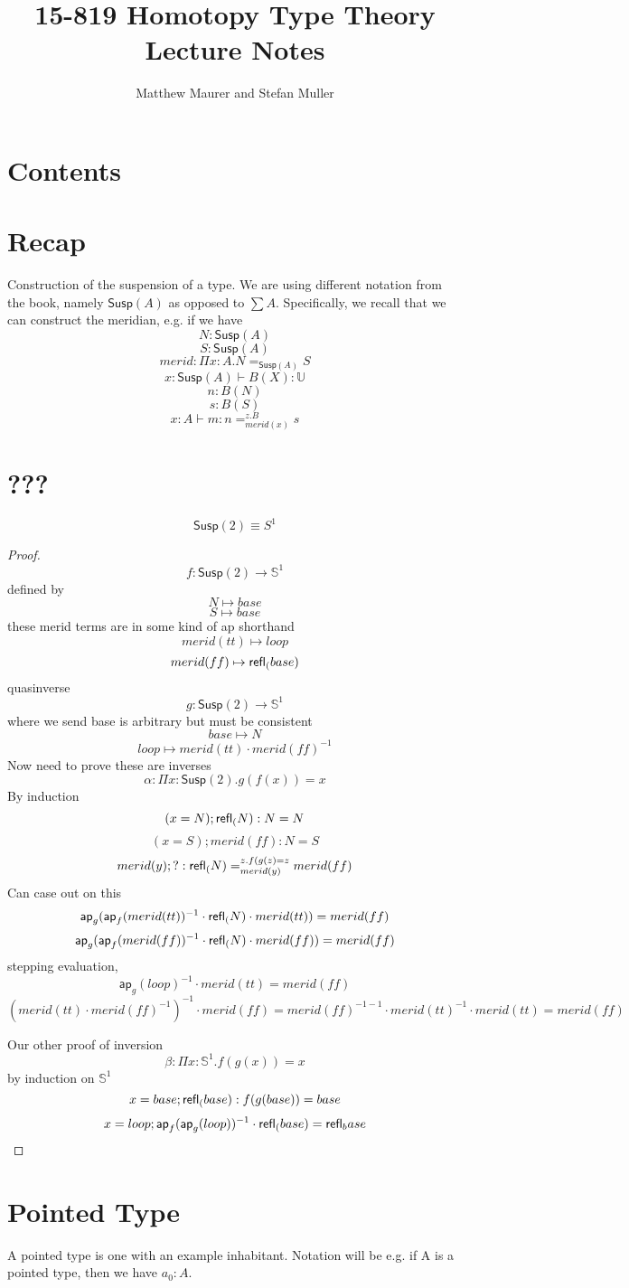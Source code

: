\documentclass[11pt]{article}
\title{15-819 Homotopy Type Theory\\Lecture Notes}
\author{Matthew Maurer and Stefan Muller}
\newcommand{\U}{\mathbb{U}}
\renewcommand{\SS}{\mathbb{S}}
\newcommand*{\ap}{\mathsf{ap}}
\newcommand{\susp}[1]{\mathsf{Susp}(#1)}
\begin{document}
\maketitle
\section{Contents}
\section{Recap}
Construction of the suspension of a type. We are using different notation from the book, namely $\susp{A}$ as opposed to $\sum A$.
Specifically, we recall that we can construct the meridian, e.g. if we have
$$N : \susp{A}$$
$$S : \susp{A}$$
$$merid : \Pi x : A . N =_{\susp{A}} S$$
$$x : \susp{A} \vdash B(X) : \U$$
$$n : B(N)$$
$$s : B(S)$$
$$x : A \vdash m : n =_{merid(x)}^{z.B} s$$
\section{???}
$$\susp{2} \equiv S^1$$
\begin{proof}
$$f : \susp{2} \rightarrow \SS^1$$
defined by 
$$N \mapsto base$$
$$S \mapsto base$$
these merid terms are in some kind of ap shorthand
$$merid(tt) \mapsto loop$$
$$merid(ff) \mapsto \mathsf{refl}_{(} base)$$
quasinverse
$$g : \susp{2} \rightarrow \SS^1$$
where we send base is arbitrary but must be consistent
$$base \mapsto N$$
$$loop \mapsto merid(tt) \cdot merid(ff)^{-1}$$
Now need to prove these are inverses
$$\alpha : \Pi x : \susp{2} . g(f(x)) = x$$
By induction
$$(x = N); \mathsf{refl}_{(} N) : N = N$$
$$(x = S); merid(ff) : N = S$$
$$merid(y); ? : \mathsf{refl}_{(} N) =_{merid(y)}^{z.f(g(z) = z} merid(ff)$$
Can case out on this
$$\ap_g (\ap_f (merid(tt))^{-1} \cdot \refl(N) \cdot merid(tt)) = merid(ff)$$
$$\ap_g (\ap_f (merid(ff))^{-1} \cdot \refl(N) \cdot merid(ff)) = merid(ff)$$
stepping evaluation,
$$\ap_g (loop)^{-1} \cdot merid(tt) = merid(ff)$$
$$(merid(tt) \cdot merid(ff)^{-1})^{-1} \cdot merid(ff) = merid(ff)^{-1-1} \cdot merid(tt)^{-1} \cdot merid(tt) = merid(ff)$$

Our other proof of inversion
$$\beta : \Pi x : \SS^1 . f(g(x)) = x$$
by induction on $\SS^1$
$$x = base; \mathsf{refl}_{(} base) : f(g(base)) = base$$
$$x = loop; \ap_f(\ap_g(loop))^{-1} \cdot \refl(base) = \refl base $$
\end{proof}
\section{Pointed Type}
A pointed type is one with an example inhabitant. Notation will be e.g. if A is a pointed type, then we have $a_0 : A$.
\end{document}
